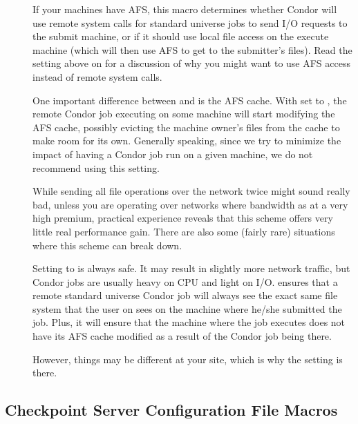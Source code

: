 \begin{description}
\item[] \label{param:UseAfs} If your machines have AFS,
  this
  macro determines whether Condor will use remote system calls for
  standard universe jobs to send I/O requests to the submit machine,
  or if it should use local file access on the execute machine (which
  will then use AFS to get to the submitter's files).  Read the
  setting above on  for a discussion of why you might
  want to use AFS access instead of remote system calls.
  
  One important difference between  and
   is the AFS cache.  With  set to
  , the remote Condor job executing on some machine will start
  modifying the AFS cache, possibly evicting the machine owner's
  files from the cache to make room for its own.  Generally speaking,
  since we try to minimize the impact of having a Condor job run on a
  given machine, we do not recommend using this setting.

  While sending all file operations over the network twice might sound
  really bad, unless you are operating over networks where bandwidth
  as at a very high premium, practical experience reveals that this
  scheme offers very little real performance gain.  There are also
  some (fairly rare) situations where this scheme can break down.
  
  Setting  to  is always safe.  It may result
  in slightly more network traffic, but Condor jobs are usually heavy
  on CPU and light on I/O.   ensures that a remote
  standard universe Condor job will always see the exact same
  file system that the user on sees on the machine where he/she
  submitted the job.  Plus, it will ensure that the machine where the
  job executes does not have its AFS cache modified as a result of
  the Condor job being there.  
  
  However, things may be different at your site, which is why the
  setting is there.

\end{description}

\subsection{\label{Checkpoint-Server-Config-File-Entries}Checkpoint Server Configuration File Macros} 

